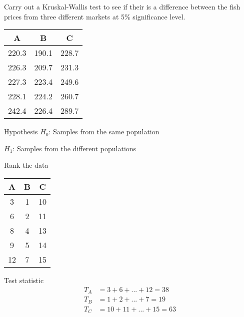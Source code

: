         \begin{example}
        {
            Carry out a Kruskal-Wallis test to see if their is a difference between the fish prices from three different markets at 5\% significance level.

            \begin{center}
            \begin{tabular}{c|c|c}
                A     & B     & C     \\
                \hline
                220.3 & 190.1 & 228.7 \\
                226.3 & 209.7 & 231.3 \\
                227.3 & 223.4 & 249.6 \\
                228.1 & 224.2 & 260.7 \\
                242.4 & 226.4 & 289.7
            \end{tabular}
            \end{center}
        }

        \begin{step}{Hypothesis}
        $H_0$: Samples from the same population
        
        $H_1$: Samples from the different populations
        \end{step}

        \begin{step}{Rank the data}
        \begin{center}
        \begin{tabular}{c|c|c}
        A  & B & C  \\
        \hline
        3  & 1 & 10 \\
        6  & 2 & 11 \\
        8  & 4 & 13 \\
        9  & 5 & 14 \\
        12 & 7 & 15
        \end{tabular}
        \end{center}
        \end{step}

        \begin{step}{Test statistic}
        \begin{align*}
        T_A &= 3 + 6 + ... + 12 = 38\\
        T_B &= 1 + 2 + ... + 7 = 19\\
        T_C &= 10 + 11 + ... + 15 = 63\\
        \end{align*}


\end{step}
\end{example}

